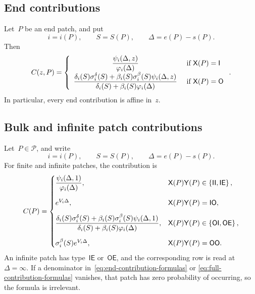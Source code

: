 \documentclass[EJP,preprint,NODS,nobera]{ejpecp}
\begin{document}
\subsection{End contributions}
\label{app:end-formulas}

Let~$P$ be an end patch, and put
\begin{equation*}
i=i(P),
\qquad
S=S(P),
\qquad
\Delta=e(P)-s(P).
\end{equation*}
Then
\begin{equation}
\label{eq:end-contribution-formulas}
C(z,P)
=
\left\{\begin{array}{cl} 
\displaystyle
\frac{\psi_i(\Delta,z)}{\varphi_i(\Delta)}
 &\text{ if } \mathsf X(P)=\mathsf I \\ 
\displaystyle
\frac{
\delta_i(S)\sigma_i^\delta(S)
+
\beta_i(S)\sigma_i^\beta(S)\psi_i(\Delta,z)
}{
\delta_i(S)+\beta_i(S)\varphi_i(\Delta)
}
 &\text{ if } \mathsf X(P)=\mathsf O \end{array}\right..
\end{equation}
In particular, every end contribution is affine in~$z$.

\subsection{Bulk and infinite patch contributions}
\label{app:bulk-formulas}

Let~$P\in\mathcal P$, and write
\begin{equation*}
i=i(P),
\qquad
S=S(P),
\qquad
\Delta=e(P)-s(P).
\end{equation*}
For finite and infinite patches, the contribution is
\begin{equation}
\label{eq:full-contribution-formulas}
C(P)
=
\begin{cases}
\displaystyle
\frac{\psi_i(\Delta,1)}{\varphi_i(\Delta)},
&\mathsf X(P)\mathsf Y(P)\in\left\{\mathsf{II},\mathsf{IE}\right\},
\\[1.4em]
e^{V_i\Delta},
&\mathsf X(P)\mathsf Y(P)=\mathsf{IO},
\\[0.8em]
\displaystyle
\frac{
\delta_i(S)\sigma_i^\delta(S)
+
\beta_i(S)\sigma_i^\beta(S)\psi_i(\Delta,1)
}{
\delta_i(S)+\beta_i(S)\varphi_i(\Delta)
},
&\mathsf X(P)\mathsf Y(P)\in\left\{\mathsf{OI},\mathsf{OE}\right\},
\\[1.4em]
\sigma_i^\beta(S)e^{V_i\Delta},
&\mathsf X(P)\mathsf Y(P)=\mathsf{OO}.
\end{cases}
\end{equation}
An infinite patch has type~$\mathsf{IE}$ or~$\mathsf{OE}$, and the
corresponding row is read at~$\Delta=\infty$. If a denominator in~\eqref{eq:end-contribution-formulas} or
\eqref{eq:full-contribution-formulas} vanishes, that patch has zero
probability of occurring, so the formula is irrelevant.
\end{document}
